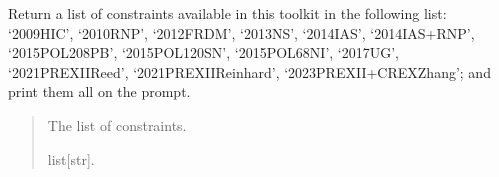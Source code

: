 \documentclass[letterpaper,10pt,english]{sphinxmanual}
\begin{document}
\begin{fulllineitems}
\label{\detokenize{source/api/setup_corr_EsymLsym:nucleardatapy.corr.setup_EsymLsym.EsymLsym_constraints}}
\pysigstartsignatures
{}
\pysigstopsignatures
\sphinxAtStartPar
Return a list of constraints available in this toolkit in the     following list: ‘2009\sphinxhyphen{}HIC’, ‘2010\sphinxhyphen{}RNP’, ‘2012\sphinxhyphen{}FRDM’, ‘2013\sphinxhyphen{}NS’,     ‘2014\sphinxhyphen{}IAS’, ‘2014\sphinxhyphen{}IAS+RNP’, ‘2015\sphinxhyphen{}POL\sphinxhyphen{}208PB’, ‘2015\sphinxhyphen{}POL\sphinxhyphen{}120SN’,     ‘2015\sphinxhyphen{}POL\sphinxhyphen{}68NI’, ‘2017\sphinxhyphen{}UG’, ‘2021\sphinxhyphen{}PREXII\sphinxhyphen{}Reed’,     ‘2021\sphinxhyphen{}PREXII\sphinxhyphen{}Reinhard’, ‘2023\sphinxhyphen{}PREXII+CREX\sphinxhyphen{}Zhang’; and     print them all on the prompt.
\begin{quote}\begin{description}
\sphinxAtStartPar
The list of constraints.

\sphinxAtStartPar
list{[}str{]}.

\end{description}\end{quote}

\end{fulllineitems}

\end{document}
